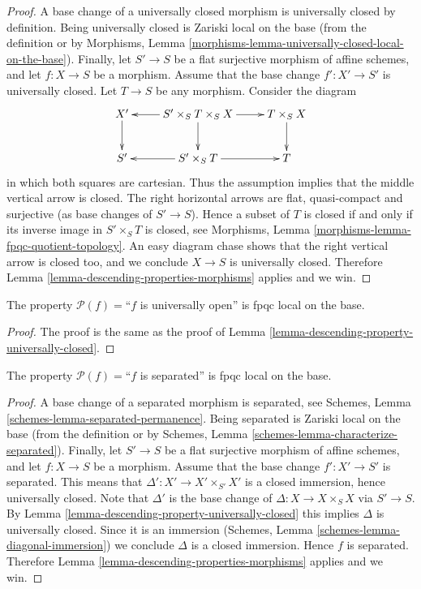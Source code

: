 \begin{proof}
A base change of a universally closed morphism is universally closed
by definition.
Being universally closed is Zariski local on the base (from the
definition or by
Morphisms, Lemma
\ref{morphisms-lemma-universally-closed-local-on-the-base}).
Finally, let
$S' \to S$ be a flat surjective morphism of affine schemes,
and let $f : X \to S$ be a morphism. Assume that the base change
$f' : X' \to S'$ is universally closed. Let $T \to S$ be any morphism.
Consider the diagram
$$
\xymatrix{
X' \ar[d] &
S' \times_S T \times_S X \ar[d] \ar[r] \ar[l] &
T \times_S X \ar[d] \\
S' &
S' \times_S T \ar[r] \ar[l] &
T
}
$$
in which both squares are cartesian.
Thus the assumption implies that the middle vertical
arrow is closed. The right horizontal arrows are flat, quasi-compact
and surjective (as base changes of $S' \to S$).
Hence a subset of $T$ is closed if and only if its inverse
image in $S' \times_S T$ is closed, see Morphisms,
Lemma \ref{morphisms-lemma-fpqc-quotient-topology}.
An easy diagram chase shows that the right vertical
arrow is closed too, and we conclude $X \to S$ is
universally closed.
Therefore Lemma \ref{lemma-descending-properties-morphisms} applies and we win.
\end{proof}

\begin{lemma}
\label{lemma-descending-property-universally-open}
The property $\mathcal{P}(f) =$``$f$ is universally open''
is fpqc local on the base.
\end{lemma}

\begin{proof}
The proof is the same as the proof of
Lemma \ref{lemma-descending-property-universally-closed}.
\end{proof}

\begin{lemma}
\label{lemma-descending-property-separated}
The property $\mathcal{P}(f) =$``$f$ is separated''
is fpqc local on the base.
\end{lemma}

\begin{proof}
A base change of a separated morphism is separated, see
Schemes, Lemma \ref{schemes-lemma-separated-permanence}.
Being separated is Zariski local on the base (from the
definition or by
Schemes, Lemma \ref{schemes-lemma-characterize-separated}).
Finally, let
$S' \to S$ be a flat surjective morphism of affine schemes,
and let $f : X \to S$ be a morphism. Assume that the base change
$f' : X' \to S'$ is separated. This means that
$\Delta' : X' \to X'\times_{S'} X'$ is a closed immersion,
hence universally closed.
Note that $\Delta'$ is the base change of $\Delta : X \to X \times_S X$
via $S' \to S$. By Lemma \ref{lemma-descending-property-universally-closed}
this implies $\Delta$ is universally closed. Since it is
an immersion
(Schemes, Lemma \ref{schemes-lemma-diagonal-immersion})
we conclude $\Delta$ is a closed immersion.
Hence $f$ is separated.
Therefore Lemma \ref{lemma-descending-properties-morphisms} applies and we win.
\end{proof}

